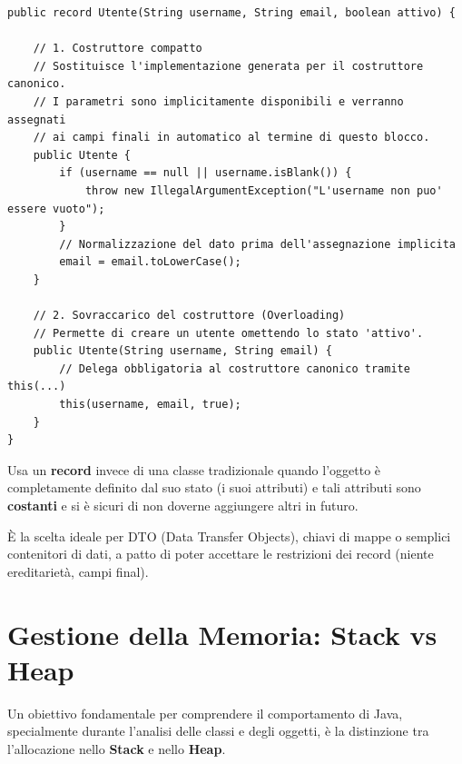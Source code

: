 \begin{lstlisting}[caption={Costruttori espliciti e overloading in un Record}]
public record Utente(String username, String email, boolean attivo) {

    // 1. Costruttore compatto
    // Sostituisce l'implementazione generata per il costruttore canonico.
    // I parametri sono implicitamente disponibili e verranno assegnati 
    // ai campi finali in automatico al termine di questo blocco.
    public Utente {
        if (username == null || username.isBlank()) {
            throw new IllegalArgumentException("L'username non puo' essere vuoto");
        }
        // Normalizzazione del dato prima dell'assegnazione implicita
        email = email.toLowerCase(); 
    }

    // 2. Sovraccarico del costruttore (Overloading)
    // Permette di creare un utente omettendo lo stato 'attivo'.
    public Utente(String username, String email) {
        // Delega obbligatoria al costruttore canonico tramite this(...)
        this(username, email, true); 
    }
}
\end{lstlisting}

\begin{tip}
Usa un \textbf{record} invece di una classe tradizionale quando l'oggetto è completamente definito dal suo stato (i suoi attributi) e tali attributi sono \textbf{costanti} e si è sicuri di non doverne aggiungere altri in futuro. 

È la scelta ideale per DTO (Data Transfer Objects), chiavi di mappe o semplici contenitori di dati, a patto di poter accettare le restrizioni dei record (niente ereditarietà, campi final).
\end{tip}

\section{Gestione della Memoria: Stack vs Heap}

Un obiettivo fondamentale per comprendere il comportamento di Java, specialmente durante l'analisi delle classi e degli oggetti, è la distinzione tra l'allocazione nello \textbf{Stack} e nello \textbf{Heap}.\vspace{\baselineskip}

